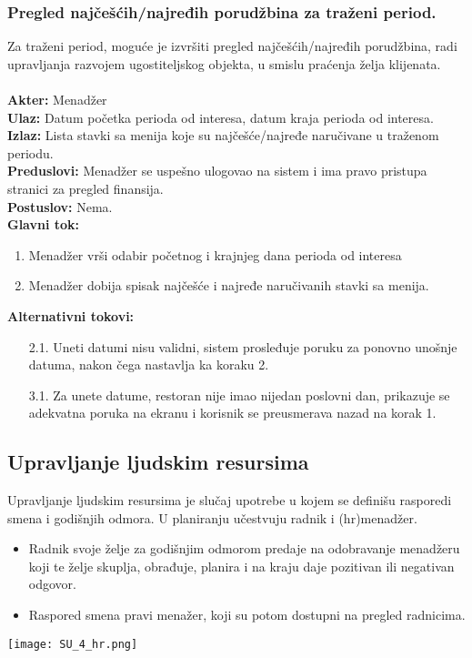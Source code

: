 \documentclass{article}
\begin{document}
\subsubsection{Pregled najčešćih/najređih porudžbina za traženi period.}
Za traženi period, moguće je izvršiti pregled najčešćih/najređih porudžbina, radi upravljanja razvojem ugostiteljskog objekta, u smislu praćenja želja klijenata.\\\\
\textbf{Akter:} Menadžer\\
\textbf{Ulaz:} Datum početka perioda od interesa, datum kraja perioda od interesa.\\
\textbf{Izlaz:} Lista stavki sa menija koje su najčešće/najređe naručivane u traženom periodu.\\
\textbf{Preduslovi:} Menadžer se uspešno ulogovao na sistem i ima pravo pristupa stranici za pregled finansija.\\
\textbf{Postuslov:} Nema.\\
\textbf{Glavni tok:}
\begin{enumerate}
\item Menadžer vrši odabir početnog i krajnjeg dana perioda od interesa
\item Menadžer dobija spisak najčešće i najređe naručivanih stavki sa menija.
\end{enumerate}
\textbf{Alternativni tokovi:}\\
\begin{itemize}
\item [2.1.] Uneti datumi nisu validni, sistem prosleđuje poruku za ponovno unošnje datuma, nakon čega nastavlja ka koraku 2.
\item [3.1.] Za unete datume, restoran nije imao nijedan poslovni dan, prikazuje se adekvatna poruka na ekranu i korisnik se preusmerava nazad na korak 1.
\end{itemize}


\subsection{Upravljanje ljudskim resursima}
Upravljanje ljudskim resursima je slučaj upotrebe u kojem se definišu rasporedi smena i godišnjih odmora. U planiranju učestvuju radnik i (hr)menadžer.

\begin{itemize}
\item Radnik svoje želje za godišnjim odmorom predaje na odobravanje menadžeru koji te želje skuplja, obrađuje, planira i na kraju daje pozitivan ili negativan odgovor.
\item Raspored smena pravi menažer, koji su potom dostupni na pregled radnicima.
\end{itemize}
\texttt{[image: SU\_4\_hr.png]}
\end{document}
